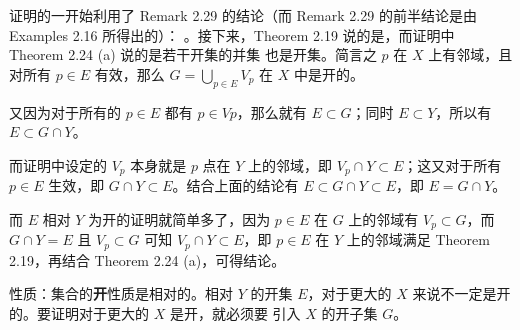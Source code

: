 \documentclass[../poma-notes.tex]{subfiles}
\begin{document}
\begin{anote}
  证明的一开始利用了 Remark 2.29 的结论（而 Remark 2.29 的前半结论是由 Examples 2.16 所得出的）：
  。接下来，Theorem 2.19 说的是，而证明中 Theorem 2.24 (a) 说的是若干开集的并集
  也是开集。简言之 $p$ 在 $X$ 上有邻域，且对所有 $p \in E$ 有效，那么 $G=\bigcup\limits_{p \in E} V_p$ 在 $X$ 中是开的。

  又因为对于所有的 $p \in E$ 都有 $p \in Vp$，那么就有 $E \subset G$；同时 $E \subset Y$，所以有 $E \subset G \cap Y$。

  而证明中设定的 $V_p$ 本身就是 $p$ 点在 $Y$ 上的邻域，即 $V_p \cap Y \subset E$；这又对于所有 $p \in E$ 生效，即
  $G \cap Y \subset E$。结合上面的结论有 $E \subset G \cap Y \subset E$，即 $E = G \cap Y$。

  而 $E$ 相对 $Y$ 为开的证明就简单多了，因为 $p \in E$ 在 $G$ 上的邻域有 $V_p \subset G$，而 $G \cap Y=E$ 且 $V_p \subset G$
  可知 $V_p \cap Y \subset E$，即 $p \in E$ 在 $Y$ 上的邻域满足 Theorem 2.19，再结合 Theorem 2.24 (a)，可得结论。

  性质：集合的\textbf{开}性质是相对的。相对 $Y$ 的开集 $E$，对于更大的 $X$ 来说不一定是开的。要证明对于更大的 $X$ 是开，就必须要
  引入 $X$ 的开子集 $G$。
\end{anote}
\end{document}
